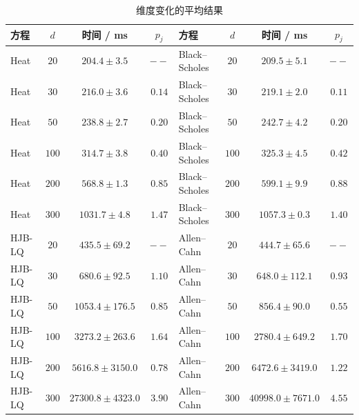       \begin{table}[htbp]
        \centering
        \caption{维度变化的平均结果}
        \label{tab:dimension_average_results}
        \small
        \begin{tabular}{lccc lccc}
          \toprule
          方程 & $d$ & 时间 / ms & $p_j$ & 方程 & $d$ & 时间 / ms & $p_j$ \\
          \midrule
          Heat & $20$ & $204.4\pm3.5$ & $--$ & Black--Scholes & $20$ & $209.5\pm5.1$ & $--$ \\
          Heat & $30$ & $216.0\pm3.6$ & $0.14$ & Black--Scholes & $30$ & $219.1\pm2.0$ & $0.11$ \\
          Heat & $50$ & $238.8\pm2.7$ & $0.20$ & Black--Scholes & $50$ & $242.7\pm4.2$ & $0.20$ \\
          Heat & $100$ & $314.7\pm3.8$ & $0.40$ & Black--Scholes & $100$ & $325.3\pm4.5$ & $0.42$ \\
          Heat & $200$ & $568.8\pm1.3$ & $0.85$ & Black--Scholes & $200$ & $599.1\pm9.9$ & $0.88$ \\
          Heat & $300$ & $1031.7\pm4.8$ & $1.47$ & Black--Scholes & $300$ & $1057.3\pm0.3$ & $1.40$ \\
          \midrule
          HJB-LQ & $20$ & $435.5\pm69.2$ & $--$ & Allen--Cahn & $20$ & $444.7\pm65.6$ & $--$ \\
          HJB-LQ & $30$ & $680.6\pm92.5$ & $1.10$ & Allen--Cahn & $30$ & $648.0\pm112.1$ & $0.93$ \\
          HJB-LQ & $50$ & $1053.4\pm176.5$ & $0.85$ & Allen--Cahn & $50$ & $856.4\pm90.0$ & $0.55$ \\
          HJB-LQ & $100$ & $3273.2\pm263.6$ & $1.64$ & Allen--Cahn & $100$ & $2780.4\pm649.2$ & $1.70$ \\
          HJB-LQ & $200$ & $5616.8\pm3150.0$ & $0.78$ & Allen--Cahn & $200$ & $6472.6\pm3419.0$ & $1.22$ \\
          HJB-LQ & $300$ & $27300.8\pm4323.0$ & $3.90$ & Allen--Cahn & $300$ & $40998.0\pm7671.0$ & $4.55$ \\
          \bottomrule
        \end{tabular}
      \end{table}


